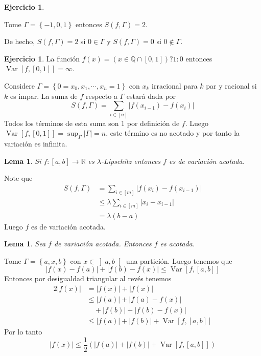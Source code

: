 \documentclass[12pt]{article}
\theoremstyle{plain}
\newtheorem{Lem}[Th]{Lema}             %
\theoremstyle{definition}
\newtheorem{Ej}[Th]{Ejercicio}
\theoremstyle{remark}
\numberwithin{equation}{section}
\DeclareMathOperator{\Var}{Var}     %
\newcommand{\la}{\lambda}           %
\newcommand{\bQ}{\mathbb{Q}}        %
\newcommand{\bR}{\mathbb{R}}        %
\renewcommand{\leq}{\leqslant}      %
\renewcommand{\:}{\colon}           %
\newcommand{\conj}[1]{\left\lbrace#1\right\rbrace}
\newcommand{\bonj}[1]{\left\lbrack#1\right\rbrack}
\newcommand{\obonj}[1]{\left\rbrack#1\right\lbrack}
\begin{document}
\begin{multicols}{2}
\begin{Ej}
\end{Ej}

\begin{ptcb}
Tome $\Gamma=\conj{-1,0,1}$ entonces $S(f,\Gamma)=2$.
\end{ptcb}

De hecho, $S(f,\Gamma)=2$ si $0\in\Gamma$ y $S(f,\Gamma)=0$ si $0\not\in\Gamma$.

\begin{Ej}
  La función $f(x)=(x\in\bQ\cap\bonj{0,1})?1\colon0$ entonces $\operatorname{Var}\bonj{f,\bonj{0,1}}=\infty$.
\end{Ej}

\begin{ptcb}
Considere $\Gamma=\conj{0=x_0,x_1,\cdots,x_n=1}$ con $x_k$ irracional para $k$ par y racional si $k$ es impar. La suma de $f$ respecto a $\Gamma$ estará dada por
$$S(f,\Gamma)=\sum_{i\in\bonj{n}}|f(x_{i-1})-f(x_{i})|$$
Todos los términos de esta suma son 1 por definición de $f$. Luego $\Var\bonj{f,\bonj{0,1}}=\sup_{\Gamma}|\Gamma|=n$, este término es no acotado y por tanto la variación es infinita.
\end{ptcb}

\begin{Lem}
  Si $f\colon\bonj{a,b}\to\bR$ es $\la$-Lipschitz entonces $f$ es de variación acotada.
\end{Lem}

\begin{ptcbp}
Note que
\begin{align*}
  S(f,\Gamma) &=\sum_{i\in\bonj{m}}|f(x_i)-f(x_{i-1})|  \\
   &\leq \la\sum_{i\in\bonj{m}}|x_i-x_{i-1}|  \\
   &=\la(b-a)
\end{align*}
Luego $f$ es de variación acotada.
\end{ptcbp}

\begin{Lem}
  Sea $f$ de variación acotada. Entonces $f$ es acotada.
\end{Lem}

\begin{ptcbp}
Tome $\Gamma=\conj{a,x,b}$ con $x\in\obonj{a,b}$ una partición. Luego tenemos que
$$|f(x)-f(a)|+|f(b)-f(x)|\leq\Var\bonj{f,\bonj{a,b}}$$
Entonces por desigualdad triangular al revés tenemos
\begin{align*}
  2|f(x)| &=|f(x)|+|f(x)| \\
   &\leq |f(a)|+|f(a)-f(x)|\\
   &\quad+|f(b)|+|f(b)-f(x)|  \\
   &\leq |f(a)|+|f(b)|+\Var\bonj{f,\bonj{a,b}}
\end{align*}
Por lo tanto $$|f(x)|\leq\frac{1}{2}\left(|f(a)|+|f(b)|+\Var\bonj{f,\bonj{a,b}}\right)$$
\end{ptcbp}


\end{multicols}
\end{document}
